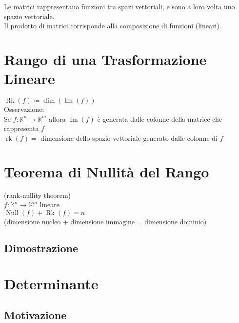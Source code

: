 \documentclass[a4paper, twoside, italian, 11pt]{book}
\DeclareMathOperator{\Ima}{Im}
\DeclareMathOperator{\Null}{Null}
\DeclareMathOperator{\Rk}{Rk}
\DeclareMathOperator{\rk}{rk}
\newcommand{\K}{\mathbb K}
\begin{document}
\noindent
Le matrici rappresentano funzioni tra spazi vettoriali, e sono a loro volta uno spazio vettoriale.\\

\noindent
Il prodotto di matrici corrisponde alla composizione di funzioni (lineari).



\section{Rango di una Trasformazione Lineare}

$\Rk(f) \coloneqq \dim(\Ima(f))$ \\

\noindent
Osservazione: \\

\noindent
Se $f : \K^n \rightarrow \K^m$ allora $\Ima(f)$ è generata dalle colonne della matrice che rappresenta $f$ \\

\noindent
$\rk(f) =$ dimensione dello spazio vettoriale generato dalle colonne di $f$



\section{Teorema di Nullità del Rango}

(rank-nullity theorem) \\

\noindent
$f : \K^n \rightarrow \K^m$ lineare \\

$\Null(f) + \Rk(f) = n$ \\

\noindent
(dimensione nucleo + dimensione immagine = dimensione dominio)


\subsection{Dimostrazione}




\section{Determinante}


\subsection{Motivazione}
\end{document}
